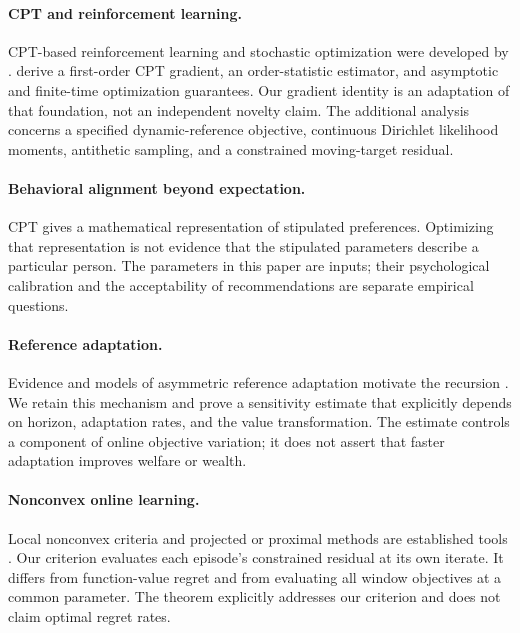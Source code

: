 \documentclass[11pt]{article}
\newcommand{\1}{\mathbf 1}
\theoremstyle{definition}
\begin{document}
\paragraph{CPT and reinforcement learning.}
CPT-based reinforcement learning and stochastic optimization were developed by \citet{prashanth2016cumulative,jie2018stochastic}. \citet{lepel2024policygradients} derive a first-order CPT gradient, an order-statistic estimator, and asymptotic and finite-time optimization guarantees. Our gradient identity is an adaptation of that foundation, not an independent novelty claim. The additional analysis concerns a specified dynamic-reference objective, continuous Dirichlet likelihood moments, antithetic sampling, and a constrained moving-target residual.

\paragraph{Behavioral alignment beyond expectation.}
CPT gives a mathematical representation of stipulated preferences. Optimizing that representation is not evidence that the stipulated parameters describe a particular person. The parameters in this paper are inputs; their psychological calibration and the acceptability of recommendations are separate empirical questions.

\paragraph{Reference adaptation.}
Evidence and models of asymmetric reference adaptation motivate the recursion \citep{arkes2008reference,arkes2010cross,he2019realization,qin2022realization}. We retain this mechanism and prove a sensitivity estimate that explicitly depends on horizon, adaptation rates, and the value transformation. The estimate controls a component of online objective variation; it does not assert that faster adaptation improves welfare or wealth.

\paragraph{Nonconvex online learning.}
Local nonconvex criteria and projected or proximal methods are established tools \citep{hazan2017efficient,aydore2019dynamic,hallak2021regret}. Our criterion evaluates each episode's constrained residual at its own iterate. It differs from function-value regret and from evaluating all window objectives at a common parameter. The theorem explicitly addresses our criterion and does not claim optimal regret rates.
\end{document}
